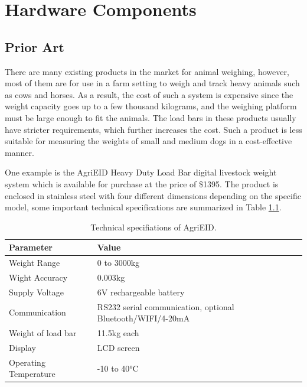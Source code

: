 
\chapter{Hardware Components}

\section{Prior Art}
There are many existing products in the market for animal weighing, however, most of them are for use in a farm setting to weigh and track heavy animals such as cows and horses. As a result, the cost of such a system is expensive since the weight capacity goes up to a few thousand kilograms, and the weighing platform must be large enough to fit the animals. The load bars in these products usually have stricter requirements, which further increases the cost. Such a product is less suitable for measuring the weights of small and medium dogs in a cost-effective manner.

One example is the AgriEID Heavy Duty Load Bar digital livestock weight system which is available for purchase at the price of \$1395. The product is enclosed in stainless steel with four different dimensions depending on the specific model, some important technical specifications are summarized in Table \ref{table:tech specs AgriEID}.

\begin{table}[h]
\centering
\begin{tabular}{|l|m{6cm}|}
    \hline
    Parameter & Value \\
    \hline
    Weight Range & 0 to 3000kg \\
    Wight Accuracy & 0.003kg \\
    Supply Voltage & 6V rechargeable battery \\
    Communication &	RS232 serial communication, optional Bluetooth/WIFI/4-20mA \\
    Weight of load bar	& 11.5kg each \\
    Display & LCD screen \\
    Operating Temperature & -10 to 40°C \\
    \hline
\end{tabular}
\caption{Technical specifiations of AgriEID.}
\label{table:tech specs AgriEID}
\end{table}

